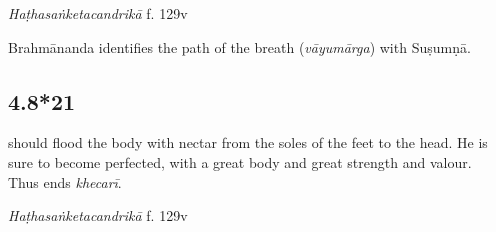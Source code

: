 \begin{ekdosis}

\begin{testimonia}[hp04_008_20]
\emph{Haṭhasaṅketacandrikā} f. 129v
\begin{versinnote}
\end{versinnote}
\end{testimonia}

\begin{philcomm}[hp04_008_20]
Brahmānanda identifies the path of the breath (\emph{vāyumārga}) with Suṣumṇā.
\end{philcomm}

\subsection*{4.8*21}
\begin{translation} should flood the body with nectar from the soles of the feet to the head. He is sure to become perfected, with a great body and great strength and valour.\\Thus ends \emph{khecarī}.
\end{translation}


\begin{testimonia}[hp04_008_21]
\emph{Haṭhasaṅketacandrikā} f. 129v
\begin{versinnote}
\end{versinnote}
\end{testimonia}





\end{ekdosis}
